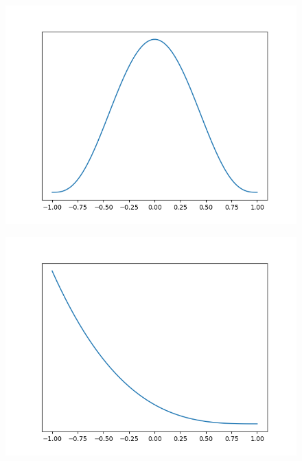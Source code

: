 \begin{figure}[!h]
    \centering
    \includegraphics[scale=0.5]
    {./content/figures/dists/beta_4_4}
    \caption{}
    \label{fig:beta-4-4}
\end{figure}

\begin{figure}[!h]
    \centering
    \includegraphics[scale=0.5]
    {./content/figures/dists/beta_1_4}
    \caption{}
    \label{fig:beta-1-4}
\end{figure}

